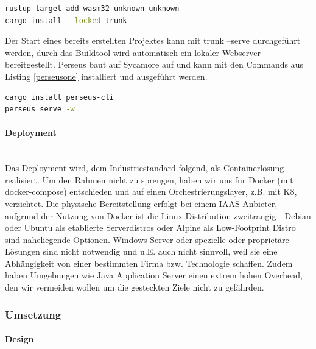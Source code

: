 \documentclass[notitlepage, hidelinks]{article}
\begin{document}
\begin{lstlisting}[language=bash,frame=single,caption=CLI Command zur Installation der Laufzeitumgebung webassembly und des WASM-Buildtools Trunk für Rust,label=rustinstallationtwo]
rustup target add wasm32-unknown-unknown
cargo install --locked trunk
\end{lstlisting}

Der Start eines bereits erstellten Projektes kann mit trunk --serve durchgeführt werden, durch das Buildtool wird automatisch ein lokaler Webserver bereitgestellt. Perseus baut auf Sycamore auf und kann mit den Commands aus Listing \ref{perseusone} installiert und ausgeführt werden.

\begin{lstlisting}[language=bash,frame=single,caption=CLI Command zur Installation der Perseus CLI und Ausführung eines Projektes,label=perseusone]
cargo install perseus-cli
perseus serve -w
\end{lstlisting}

\paragraph{Deployment} \mbox{} \\
Das Deployment wird, dem Industriestandard folgend, als Containerlösung realisiert. Um den Rahmen nicht zu sprengen, haben wir uns für Docker (mit docker-compose) entschieden und auf einen Orchestrierungslayer, z.B. mit K8, verzichtet. Die physische Bereitstellung erfolgt bei einem IAAS Anbieter, aufgrund der Nutzung von Docker ist die Linux-Distribution zweitrangig - Debian oder Ubuntu als etablierte Serverdistros oder Alpine als Low-Footprint Distro sind naheliegende Optionen. Windows Server oder spezielle oder proprietäre Lösungen sind nicht notwendig und u.E. auch nicht sinnvoll, weil sie eine Abhängigkeit von einer bestimmten Firma bzw. Technologie schaffen. Zudem haben Umgebungen wie Java Application Server einen extrem hohen Overhead, den wir vermeiden wollen um die gesteckten Ziele nicht zu gefährden. 

\subsubsection{Umsetzung}

\paragraph{Design} \mbox{} \\
\end{document}
